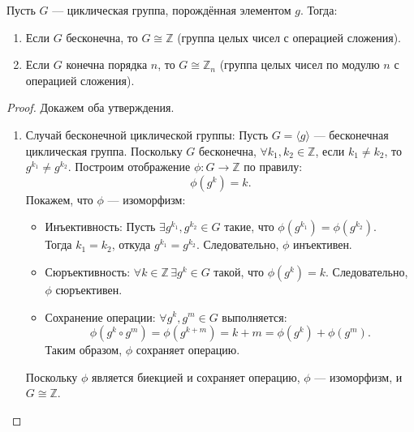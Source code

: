 \begin{shth}
    \begin{theorem}
        Пусть \( G \) — циклическая группа, порождённая элементом \( g \). Тогда:
        \begin{enumerate}
            \item Если \( G \) бесконечна, то \( G \cong \mathbb{Z} \) (группа целых чисел с операцией сложения).
            \item Если \( G \) конечна порядка \( n \), то \( G \cong \mathbb{Z}_n \) (группа целых чисел по модулю \( n \) с операцией сложения).
        \end{enumerate}
    \end{theorem}
\end{shth}

\begin{proof}
    Докажем оба утверждения.

    \begin{enumerate}
        \item Случай бесконечной циклической группы:
              Пусть \( G = \langle g \rangle \) — бесконечная циклическая группа. Поскольку \( G \) бесконечна, \( \forall k_1, k_2 \in \mathbb{Z} \), если \( k_1 \neq k_2 \), то \( g^{k_1} \neq g^{k_2} \). Построим отображение \( \phi: G \to \mathbb{Z} \) по правилу:
              \[
              \phi(g^k) = k.
              \]
              Покажем, что \( \phi \) — изоморфизм:
              \begin{itemize}
                  \item Инъективность:
                        Пусть \( \exists g^{k_1}, g^{k_2} \in G \) такие, что \( \phi(g^{k_1}) = \phi(g^{k_2}) \). \\Тогда \( k_1 = k_2 \), откуда \( g^{k_1} = g^{k_2} \). Следовательно, \( \phi \) инъективен.
                  \item Сюръективность:
                        \(\forall k \in \mathbb{Z} \, \exists g^k \in G \) такой, что \( \phi(g^k) = k \). Следовательно, \( \phi \) сюръективен.
                  \item Сохранение операции:
                        \(\forall g^k, g^m \in G \) выполняется:
                        \[
                        \phi(g^k \circ g^m) = \phi(g^{k + m}) = k + m = \phi(g^k) + \phi(g^m).
                        \]
                        Таким образом, \( \phi \) сохраняет операцию.
              \end{itemize}
              Поскольку \( \phi \) является биекцией и сохраняет операцию, \( \phi \) — изоморфизм, и \( G \cong \mathbb{Z} \).


\end{enumerate}
\end{proof}
